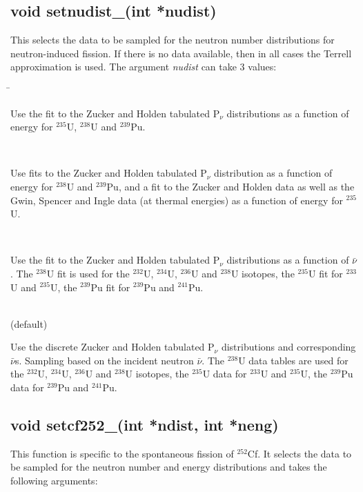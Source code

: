 \subsection*{void setnudist\_(int *nudist)
\label{setnudist}}

This selects the data to be sampled for the neutron number distributions for neutron-induced fission. If there is no data
available, then in all cases the Terrell approximation is used. The argument \textit{nudist} can take 3 values:

\begin{tabbing}

 \hspace*{.55in} \= \parbox[t]{5.5in}{ Use the fit to the Zucker and Holden tabulated P$_\nu$ distributions as a function of energy for $^{235}$U, $^{238}$U and $^{239}$Pu.}\\

 \> \parbox[t]{5.5in}{Use fits to the Zucker and Holden tabulated P$_\nu$  distribution as a function of energy for $^{238}$U and  $^{239}$Pu, and a fit to the Zucker and Holden data as well as the Gwin, Spencer and Ingle data (at thermal 
 energies) as a function of energy for $^{235}$U.}\\

 \> \parbox[t]{5.5in}{Use the fit to the Zucker and Holden tabulated P$_\nu$ distributions as a function of $\bar{\nu}$. The $^{238}$U fit is used for the $^{232}$U, $^{234}$U, $^{236}$U and $^{238}$U isotopes, the $^{235}$U fit for $^{233}$U 
and $^{235}$U, the $^{239}$Pu fit for $^{239}$Pu and $^{241}$Pu.}\\

 (default) \> \parbox[t]{5.5in}{Use the discrete Zucker and Holden tabulated P$_\nu$ distributions and corresponding $\bar{\nu}$s. Sampling based on the incident neutron $\bar{\nu}$. The $^{238}$U data tables are used for the $^{232}$U, $^{234}$U, $^{236}$U  and $^{238}$U isotopes, the $^{235}$U data for $^{233}$U and $^{235}$U, the $^{239}$Pu data for $^{239}$Pu and $^{241}$Pu.}

\end{tabbing}

\subsection*{void setcf252\_(int *ndist, int *neng)}

This function is specific to the spontaneous fission of $^{252}$Cf. It selects the data to be sampled for the neutron number and energy distributions and takes the following arguments:

